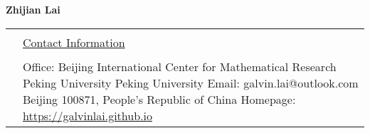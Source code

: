 \documentclass[a4paper,10pt]{article}
\newcommand{\headingfont}{\LARGE \MakeUppercase }
\newenvironment{SectionTable}[1]{
	\renewcommand*{\arraystretch}{1.0}
	\setlength{\tabcolsep}{10pt}
	\begin{longtable}{Rp{5.2in}} 
		\rule{2.3cm}{4pt} 
		& \underline{#1} \\ %
	}
	{
	\end{longtable}\vspace{-.3cm}
}
\begin{document}
	

\thispagestyle{plain}  %


\begin{center}
	{\Huge \bf Zhijian Lai} 
\end{center}
\begin{SectionTable}{\headingfont Contact Information} 
	&
	Office: \hfill \newline 
	Beijing International Center for Mathematical Research Peking University  \newline
	Peking University \hfill Email: galvin.lai@outlook.com \newline
	Beijing 100871, People's Republic of China  \hfill 
	Homepage: \href{https://galvinlai.github.io}{https://galvinlai.github.io}	
\end{SectionTable}




\end{document}
